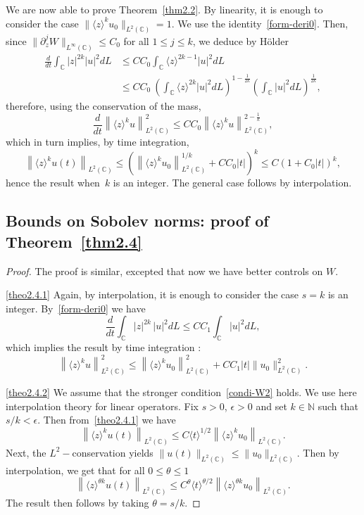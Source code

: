 \documentclass[AHL,Unicode,published]{cedram}
\newcommand{\C}{\mathbb{C}}
\newcommand{\N}{\mathbb{N}}
\newcommand*\eps{\epsilon}
\newcommand{\<}{\langle}
\renewcommand{\>}{\rangle}
\begin{document}
We are now able to prove Theorem~\ref{thm2.2}. By linearity, it is enough to consider the case ${\|\<z\>^ku_0\|_{L^2(\C)}=1}$. We use the identity~\eqref{form-deri0}. Then, since $ \|\partial^j_z W\|_{L^{\infty}(\C)}\leq C_0$ for all $1\leq j \leq k$, we deduce by H\"older
\begin{align*}
\frac{d}{dt}\int_{\C}|z|^{2k}|u|^2dL&\leq C C_0\int_{\C} \<z\>^{2k-1} |u|^2dL \\
&\leq CC_0\ \left(\int_{\C} \<z\>^{2k} |u|^2dL\right)^{1-\frac{1}{2k}} \left(\int_{\C} |u|^2dL\right)^{\frac{1}{2k}},
\end{align*}
therefore, using the conservation of the mass,
\[
\frac{d}{dt} \left\| \<z\>^ku\right\|^2_{L^2(\C)} \leq CC_0 \left\| \<z\>^ku\right\|^{2-\frac1{k}}_{L^2(\C)},
\]
which in turn implies, by time integration,
\[
\left\|\<z\>^ku(t)\right\|_{L^2(\C)}\leq \left(\left\|\<z\>^ku_0\right\|^{1/k}_{L^2(\C)}+ CC_0 |t|\right)^k \leq C\left(1 + C_0 |t|\right)^k,
\]
hence the result when~$k$ is an integer. The general case follows by interpolation.


\subsection{Bounds on Sobolev norms: proof of Theorem~\ref{thm2.4}}
\begin{proof}
The proof is similar, excepted that now we have better controls on $W$.

\eqref{theo2.4.1} Again, by interpolation, it is enough to consider the case $s=k$ is an integer. By~\eqref{form-deri0} we have
\[
\frac{d}{dt}\int_{\C}|z|^{2k}\,|u|^2dL\leq C C_1\int_{\C} |u|^2dL,
\]
which implies the result by time integration :
\[
\left\| \<z\>^ku\right\|^2_{L^2(\C)} \leq \left\| \<z\>^ku_0\right\|^2_{L^2(\C)} + CC_1|t| \| u_0\|^2_{L^2(\C)}.
\]

\eqref{theo2.4.2} We assume that the stronger condition~\eqref{condi-W2} holds. We use here interpolation theory for linear operators. Fix $s>0$, $\eps >0$ and set $k \in \N$ such that $s/k<\eps$. Then from~\eqref{theo2.4.1} we have
\[
\left\|\<z\>^ku(t)\right\|_{L^2(\C)} \leq C \<t\>^{1/2} \left\|\<z\>^ku_0\right\|_{L^2(\C)}.
\]
Next, the $L^2-$conservation yields $\|u(t)\|_{L^2(\C)} \leq \|u_0\|_{L^2(\C)} $. Then by interpolation, we get that for all $0 \leq \theta \leq 1$
\[
\left\|\<z\>^{\theta k}u(t)\right\|_{L^2(\C)} \leq C^{\theta} \<t\>^{\theta/2}
\left\|\<z\>^{\theta k}u_0\right\|_{L^2(\C)}.
\]
The result then follows by taking $\theta=s/k$.
\end{proof}
\end{document}
